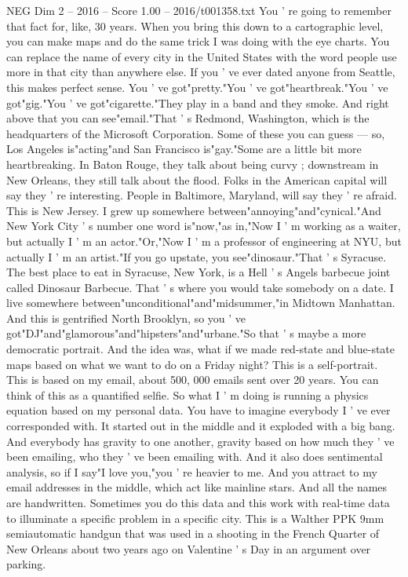 \begin{textsample}{NEG Dim 2 – 2016 – Score 1.00 – 2016/t001358.txt}
You ' re going to remember that fact for, like, 30 years.
When you bring this down to a cartographic level, you can make maps and do the same trick I was doing with the eye charts.
You can replace the name of every city in the United States with the word people use more in that city than anywhere else.
If you ' ve ever dated anyone from Seattle, this makes perfect sense.
You ' ve got"pretty."You ' ve got"heartbreak."You ' ve got"gig."You ' ve got"cigarette."They play in a band and they smoke.
And right above that you can see"email."That ' s Redmond, Washington, which is the headquarters of the Microsoft Corporation.
Some of these you can guess — so, Los Angeles is"acting"and San Francisco is"gay."Some are a little bit more heartbreaking.
In Baton Rouge, they talk about being curvy ; downstream in New Orleans, they still talk about the flood.
Folks in the American capital will say they ' re interesting.
People in Baltimore, Maryland, will say they ' re afraid.
This is New Jersey.
I grew up somewhere between"annoying"and"cynical."And New York City ' s number one word is"now,"as in,"Now I ' m working as a waiter, but actually I ' m an actor."Or,"Now I ' m a professor of engineering at NYU, but actually I ' m an artist."If you go upstate, you see"dinosaur."That ' s Syracuse.
The best place to eat in Syracuse, New York, is a Hell ' s Angels barbecue joint called Dinosaur Barbecue.
That ' s where you would take somebody on a date.
I live somewhere between"unconditional"and"midsummer,"in Midtown Manhattan.
And this is gentrified North Brooklyn, so you ' ve got"DJ"and"glamorous"and"hipsters"and"urbane."So that ' s maybe a more democratic portrait.
And the idea was, what if we made red-state and blue-state maps based on what we want to do on a Friday night?
This is a self-portrait.
This is based on my email, about 500, 000 emails sent over 20 years.
You can think of this as a quantified selfie.
So what I ' m doing is running a physics equation based on my personal data.
You have to imagine everybody I ' ve ever corresponded with.
It started out in the middle and it exploded with a big bang.
And everybody has gravity to one another, gravity based on how much they ' ve been emailing, who they ' ve been emailing with.
And it also does sentimental analysis, so if I say"I love you,"you ' re heavier to me.
And you attract to my email addresses in the middle, which act like mainline stars.
And all the names are handwritten.
Sometimes you do this data and this work with real-time data to illuminate a specific problem in a specific city.
This is a Walther PPK 9mm semiautomatic handgun that was used in a shooting in the French Quarter of New Orleans about two years ago on Valentine ' s Day in an argument over parking.

\end{textsample}
